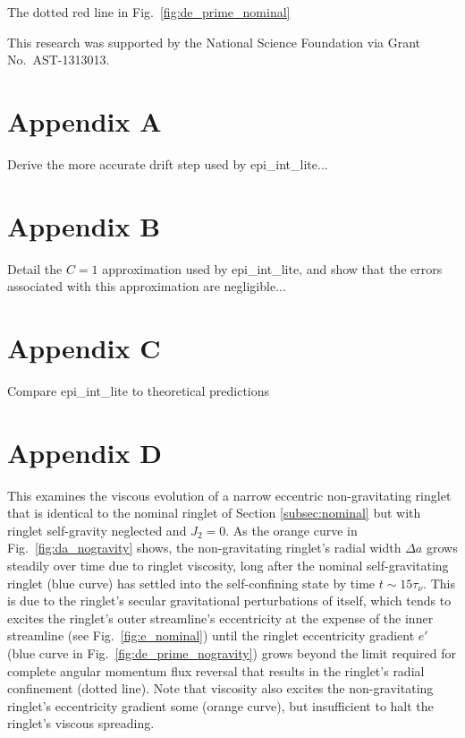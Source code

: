 \documentclass[preprint]{aastex62}
\begin{document}
The dotted red line in Fig.\ \ref{fig:de_prime_nominal}

\acknowledgments

This research was supported by the National Science Foundation via Grant No.\ AST-1313013.

\appendix

\section{Appendix A}
\label{sec:Appendix A}

Derive the more accurate drift step used by epi\_int\_lite...

\section{Appendix B}
\label{sec:Appendix B}

Detail the $C=1$ approximation used by epi\_int\_lite, and show that the errors
associated with this approximation are negligible...

\section{Appendix C}
\label{sec:Appendix C}

Compare epi\_int\_lite to theoretical predictions

\section{Appendix D}
\label{sec:Appendix D}

This examines the viscous evolution of a narrow eccentric non-gravitating
ringlet that is identical to the nominal ringlet of Section \ref{subsec:nominal} but
with ringlet self-gravity neglected and $J_2=0$.
As the orange curve in Fig.\ \ref{fig:da_nogravity} shows, the non-gravitating ringlet's
radial width $\Delta a$ grows steadily over time due to ringlet viscosity, 
long after the nominal self-gravitating ringlet (blue curve)
has settled into the self-confining state by time $t\sim15\tau_\nu$. This is due to the
ringlet's secular gravitational perturbations of itself,
which tends to excites the ringlet's outer streamline's eccentricity at the expense
of the inner streamline (see Fig.\ \ref{fig:e_nominal}) until the ringlet eccentricity gradient $e'$
(blue curve in Fig.\ \ref{fig:de_prime_nogravity}) grows beyond the
limit required for complete angular momentum flux reversal 
that results in the ringlet's radial confinement (dotted line). 
Note that viscosity also excites the non-gravitating
ringlet's eccentricity gradient some (orange curve), but insufficient to halt the ringlet's 
viscous spreading.
\end{document}
